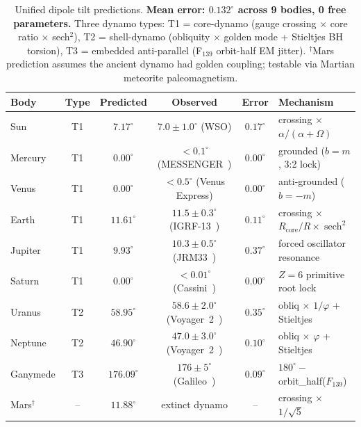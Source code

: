 \begin{table}[ht]
\centering
\renewcommand{\arraystretch}{1.3}
\begin{tabular}{@{}lccccl@{}}
\toprule
\textbf{Body} & \textbf{Type} & \textbf{Predicted} & \textbf{Observed} & \textbf{Error} & \textbf{Mechanism} \\
\midrule
Sun      & T1 & $7.17^\circ$  & $7.0 \pm 1.0^\circ$ (WSO) & $0.17^\circ$ & crossing $\times$ $\alpha/(\alpha + \Omega)$ \\
Mercury  & T1 & $0.00^\circ$  & $< 0.1^\circ$ (MESSENGER~\cite{pettengill1965}) & $0.00^\circ$ & grounded ($b = m$, 3:2 lock) \\
Venus    & T1 & $0.00^\circ$  & $< 0.5^\circ$ (Venus Express) & $0.00^\circ$ & anti-grounded ($b = -m$) \\
Earth    & T1 & $11.61^\circ$ & $11.5 \pm 0.3^\circ$ (IGRF-13~\cite{alken2021}) & $0.11^\circ$ & crossing $\times$ $R_{\text{core}}/R \times \operatorname{sech}^2$ \\
Jupiter  & T1 & $9.93^\circ$  & $10.3 \pm 0.5^\circ$ (JRM33~\cite{connerney2022}) & $0.37^\circ$ & forced oscillator resonance \\
Saturn   & T1 & $0.00^\circ$  & $< 0.01^\circ$ (Cassini~\cite{dougherty2018}) & $0.00^\circ$ & $Z = 6$ primitive root lock \\
Uranus   & T2 & $58.95^\circ$ & $58.6 \pm 2.0^\circ$ (Voyager~2~\cite{ness1986}) & $0.35^\circ$ & obliq $\times$ $1/\varphi$ + Stieltjes \\
Neptune  & T2 & $46.90^\circ$ & $47.0 \pm 3.0^\circ$ (Voyager~2~\cite{ness1989}) & $0.10^\circ$ & obliq $\times$ $\varphi$ + Stieltjes \\
Ganymede & T3 & $176.09^\circ$ & $176 \pm 5^\circ$ (Galileo~\cite{kivelson2002}) & $0.09^\circ$ & $180^\circ - $ orbit\_half($F_{139}$) \\
\midrule
Mars$^\dagger$ & -- & $11.88^\circ$ & extinct dynamo & -- & crossing $\times$ $1/\sqrt{5}$ \\
\bottomrule
\end{tabular}
\caption{Unified dipole tilt predictions. \textbf{Mean error: $0.132^\circ$ across 9 bodies, 0 free parameters.} Three dynamo types: T1 = core-dynamo (gauge crossing $\times$ core ratio $\times$ sech$^2$), T2 = shell-dynamo (obliquity $\times$ golden mode + Stieltjes BH torsion), T3 = embedded anti-parallel (F$_{139}$ orbit-half EM jitter). $^\dagger$Mars prediction assumes the ancient dynamo had golden coupling; testable via Martian meteorite paleomagnetism.}
\label{tab:hyperbolic_corrections}
\end{table}

